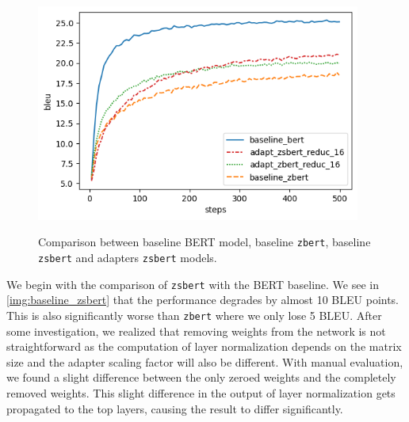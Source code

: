 \begin{figure}[]
    {\includegraphics[width=0.95\textwidth]{img/adapter_zsbert.png}}
    \centering
    \caption{Comparison between baseline BERT model, baseline \texttt{zbert}, baseline \texttt{zsbert} and adapters \texttt{zsbert} models.}
    \label{img:adapter_zsbert}
\end{figure}


We begin with the comparison of \texttt{zsbert} with the BERT baseline. We see in \cref{img:baseline_zsbert} that the performance degrades by almost 10 BLEU points. This is also significantly worse than \texttt{zbert} where we only lose 5 BLEU. After some investigation, we realized that removing weights from the network is not straightforward as the computation of layer normalization depends on the matrix size and the adapter scaling factor will also be different. With manual evaluation, we found a slight difference between the only zeroed weights and the completely removed weights. This slight difference in the output of layer normalization gets propagated to the top layers, causing the result to differ significantly.


